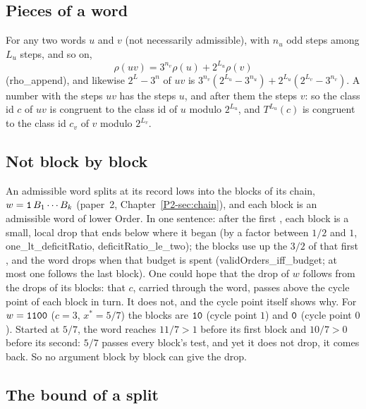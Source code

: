 \documentclass[10pt,a4paper,titlepage]{article}
\newcommand{\lean}[1]{\textsf{#1}}
\begin{document}
\subsection*{Pieces of a word}

For any two words $u$ and $v$ (not necessarily admissible), with $n_u$ odd steps among
$L_u$ steps, and so on,
\[
\rho(uv) = 3^{n_v}\rho(u) + 2^{L_u}\rho(v)
\]
(\lean{rho\_append}), and likewise $2^{L} - 3^{n}$ of $uv$ is $3^{n_v}(2^{L_u} - 3^{n_u})
+ 2^{L_u}(2^{L_v} - 3^{n_v})$. A number with the steps $uv$ has the steps $u$, and after
them the steps $v$: so the class id $c$ of $uv$ is congruent to the class id of $u$ modulo
$2^{L_u}$, and $T^{L_u}(c)$ is congruent to the class id $c_v$ of $v$ modulo $2^{L_v}$.

\subsection*{Not block by block}

An admissible word splits at its record lows into the blocks of its chain,
$w = \text{\texttt{1}}\,B_1 \cdots B_k$ (paper~2, Chapter~\ref{P2-sec:chain}), and each block is an
admissible word of lower Order. In one sentence: after the first , each block is a
small, local drop that ends below where it began (by a factor between $1/2$ and $1$,
\lean{one\_lt\_deficitRatio}, \lean{deficitRatio\_le\_two}); the blocks use up the $3/2$ of
that first , and the word drops when that budget is spent (\lean{validOrders\_iff\_budget};
at most one  follows the last block). One could hope that the drop of $w$ follows from the drops
of its blocks: that $c$, carried through the word, passes above the cycle point of each
block in turn. It does not, and the cycle point itself shows why. For $w = \text{\texttt{1100}}$
($c = 3$, $x^* = 5/7$) the blocks are $\text{\texttt{10}}$ (cycle point $1$) and $\text{\texttt{0}}$ (cycle
point $0$). Started at $5/7$, the word reaches $11/7 > 1$ before its first block and
$10/7 > 0$ before its second: $5/7$ passes every block's test, and yet it does not drop,
it comes back. So no argument block by block can give the drop.

\subsection*{The bound of a split}
\end{document}
